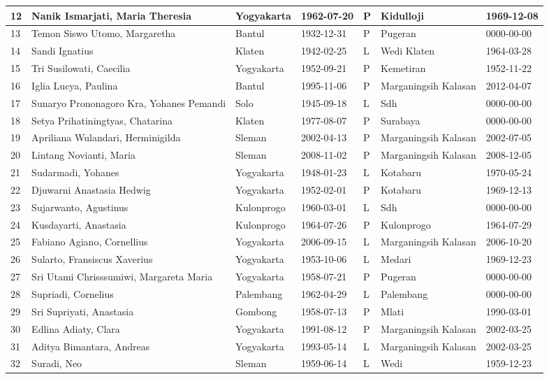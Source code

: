 \begin{longtable}{|m{5mm}|m{45mm}|m{20mm}|m{20mm}|m{5mm}|m{25mm}|m{20mm}|}
	12&Nanik Ismarjati, Maria Theresia&Yogyakarta&1962-07-20&P&Kidulloji&1969-12-08\\ \hline 
	13&Temon Siswo Utomo, Margaretha&Bantul&1932-12-31&P&Pugeran&0000-00-00\\ \hline 
	14&Sandi Ignatius&Klaten&1942-02-25&L&Wedi Klaten&1964-03-28\\ \hline 
	15&Tri Susilowati, Caecilia&Yogyakarta&1952-09-21&P&Kemetiran&1952-11-22\\ \hline 
	16&Iglia Lucya, Paulina&Bantul&1995-11-06&P&Marganingsih Kalasan&2012-04-07\\ \hline 
	17&Sunaryo Prononagoro Kra, Yohanes Pemandi&Solo&1945-09-18&L&Sdh&0000-00-00\\ \hline 
	18&Setya Prihatiningtyas, Chatarina&Klaten&1977-08-07&P&Surabaya&0000-00-00\\ \hline 
	19&Apriliana Wulandari, Herminigilda&Sleman&2002-04-13&P&Marganingsih Kalasan&2002-07-05\\ \hline 
	20&Lintang Novianti, Maria&Sleman&2008-11-02&P&Marganingsih Kalasan&2008-12-05\\ \hline 
	21&Sudarmadi, Yohanes&Yogyakarta&1948-01-23&L&Kotabaru&1970-05-24\\ \hline 
	22&Djuwarni Anastasia Hedwig&Yogyakarta&1952-02-01&P&Kotabaru&1969-12-13\\ \hline 
	23&Sujarwanto, Agustinus&Kulonprogo&1960-03-01&L&Sdh&0000-00-00\\ \hline 
	24&Kusdayarti, Anastasia&Kulonprogo&1964-07-26&P&Kulonprogo&1964-07-29\\ \hline 
	25&Fabiano Agiano, Cornellius&Yogyakarta&2006-09-15&L&Marganingsih Kalasan&2006-10-20\\ \hline 
	26&Sularto, Fransiscus Xaverius&Yogyakarta&1953-10-06&L&Medari&1969-12-23\\ \hline 
	27&Sri Utami Chrisssumiwi, Margareta Maria&Yogyakarta&1958-07-21&P&Pugeran&0000-00-00\\ \hline 
	28&Supriadi, Cornelius&Palembang&1962-04-29&L&Palembang&0000-00-00\\ \hline 
	29&Sri Supriyati, Anastasia&Gombong&1958-07-13&P&Mlati&1990-03-01\\ \hline 
	30&Edlina Adiaty, Clara&Yogyakarta&1991-08-12&P&Marganingsih Kalasan&2002-03-25\\ \hline 
	31&Aditya Bimantara, Andreas&Yogyakarta&1993-05-14&L&Marganingsih Kalasan&2002-03-25\\ \hline 
	32&Suradi, Neo&Sleman&1959-06-14&L&Wedi&1959-12-23\\ \hline 

\end{longtable}

